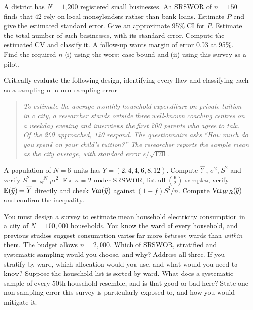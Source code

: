 A district has $N=1{,}200$ registered small businesses. An SRSWOR of $n=150$ finds that $42$
rely on local moneylenders rather than bank loans.
 Estimate $P$ and give the estimated standard error.
 Give an approximate 95\% CI for $P$.
 Estimate the total number of such businesses, with its standard error.
 Compute the estimated CV and classify it.
 A follow-up wants margin of error $0.03$ at 95\%. Find the required $n$ (i) using the
worst-case bound and (ii) using this survey as a pilot.

Critically evaluate the following design, identifying every flaw and classifying each as a
sampling or a non-sampling error.
\begin{quote}\small
\emph{To estimate the average monthly household expenditure on private tuition in a city, a
researcher stands outside three well-known coaching centres on a weekday evening and interviews
the first 200 parents who agree to talk. Of the 200 approached, 120 respond. The questionnaire
asks ``How much do you spend on your child's tuition?'' The researcher reports the sample mean as
the city average, with standard error $s/\sqrt{120}$.}
\end{quote}

A population of $N=6$ units has $Y=(2,4,4,6,8,12)$.
 Compute $\overline{Y}$, $\sigma^2$, $S^2$ and verify $S^2=\frac{N}{N-1}\sigma^2$.
 For $n=2$ under SRSWOR, list all $\binom62$ samples, verify $\mathbb{E}(\bar{y})=\overline{Y}$ directly and
check $\operatorname{Var}(\bar{y})$ against $(1-f)S^2/n$.
 Compute $\operatorname{Var}_{WR}(\bar{y})$ and confirm the inequality.

You must design a survey to estimate mean household electricity consumption in a city of
$N=100{,}000$ households. You know the ward of every household, and previous studies suggest
consumption varies far more \emph{between} wards than \emph{within} them. The budget allows
$n=2{,}000$.
 Which of SRSWOR, stratified and systematic sampling would you choose, and why? Address all
three.
 If you stratify by ward, which allocation would you use, and what would you need to know?
 Suppose the household list is sorted by ward. What does a systematic sample of every
$50$th household resemble, and is that good or bad here?
 State one non-sampling error this survey is particularly exposed to, and how you would
mitigate it.
